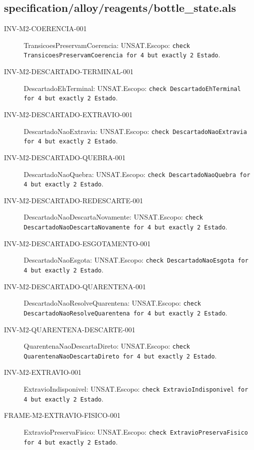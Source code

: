 \subsection*{specification/alloy/reagents/bottle\_state.als}
\begin{description}
\item[INV-M2-COERENCIA-001] TransicoesPreservamCoerencia: UNSAT.\newline Escopo: \texttt{check TransicoesPreservamCoerencia for 4 but exactly 2 Estado}.
\item[INV-M2-DESCARTADO-TERMINAL-001] DescartadoEhTerminal: UNSAT.\newline Escopo: \texttt{check DescartadoEhTerminal for 4 but exactly 2 Estado}.
\item[INV-M2-DESCARTADO-EXTRAVIO-001] DescartadoNaoExtravia: UNSAT.\newline Escopo: \texttt{check DescartadoNaoExtravia for 4 but exactly 2 Estado}.
\item[INV-M2-DESCARTADO-QUEBRA-001] DescartadoNaoQuebra: UNSAT.\newline Escopo: \texttt{check DescartadoNaoQuebra for 4 but exactly 2 Estado}.
\item[INV-M2-DESCARTADO-REDESCARTE-001] DescartadoNaoDescartaNovamente: UNSAT.\newline Escopo: \texttt{check DescartadoNaoDescartaNovamente for 4 but exactly 2 Estado}.
\item[INV-M2-DESCARTADO-ESGOTAMENTO-001] DescartadoNaoEsgota: UNSAT.\newline Escopo: \texttt{check DescartadoNaoEsgota for 4 but exactly 2 Estado}.
\item[INV-M2-DESCARTADO-QUARENTENA-001] DescartadoNaoResolveQuarentena: UNSAT.\newline Escopo: \texttt{check DescartadoNaoResolveQuarentena for 4 but exactly 2 Estado}.
\item[INV-M2-QUARENTENA-DESCARTE-001] QuarentenaNaoDescartaDireto: UNSAT.\newline Escopo: \texttt{check QuarentenaNaoDescartaDireto for 4 but exactly 2 Estado}.
\item[INV-M2-EXTRAVIO-001] ExtravioIndisponivel: UNSAT.\newline Escopo: \texttt{check ExtravioIndisponivel for 4 but exactly 2 Estado}.
\item[FRAME-M2-EXTRAVIO-FISICO-001] ExtravioPreservaFisico: UNSAT.\newline Escopo: \texttt{check ExtravioPreservaFisico for 4 but exactly 2 Estado}.

\end{description}
